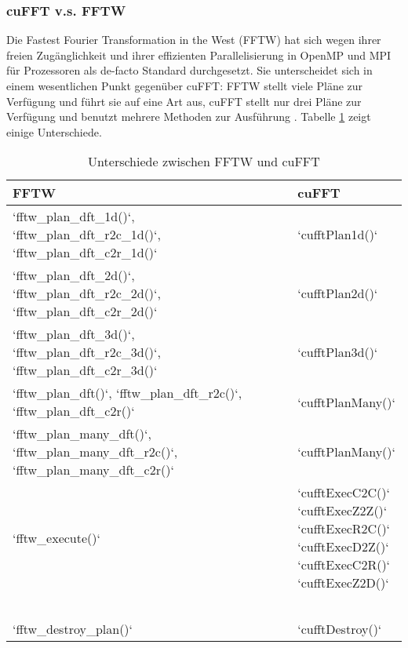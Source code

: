 		 	\subsubsection{cuFFT v.s. FFTW}\label{fftw}
		 	Die Fastest Fourier Transformation in the West (FFTW) hat sich wegen ihrer freien Zugänglichkeit und ihrer effizienten Parallelisierung in OpenMP und MPI für Prozessoren als de-facto Standard durchgesetzt. Sie unterscheidet sich in einem wesentlichen Punkt gegenüber cuFFT: FFTW stellt viele Pläne zur Verfügung und führt sie auf eine Art aus, cuFFT stellt nur drei Pläne zur Verfügung und benutzt mehrere Methoden zur Ausführung \autocite{FFTW05}. Tabelle \ref{tab5:fftw} zeigt einige Unterschiede.
		 	\begin{table}[h]
		 	\centering
		 	\begin{tabular}{|l|l|}
		 		\hline
		 		FFTW & cuFFT \\ \hline\hline
		 		\li`fftw_plan_dft_1d()`, \li`fftw_plan_dft_r2c_1d()`, \li`fftw_plan_dft_c2r_1d()` & \li`cufftPlan1d()` \\ \hline
		 		\li`fftw_plan_dft_2d()`, \li`fftw_plan_dft_r2c_2d()`, \li`fftw_plan_dft_c2r_2d()` & \li`cufftPlan2d()` \\ \hline
		 		\li`fftw_plan_dft_3d()`, \li`fftw_plan_dft_r2c_3d()`, \li`fftw_plan_dft_c2r_3d()` & \li`cufftPlan3d()` \\ \hline
		 		\li`fftw_plan_dft()`, \li`fftw_plan_dft_r2c()`, \li`fftw_plan_dft_c2r()` & \li`cufftPlanMany()` \\ \hline
		 		\li`fftw_plan_many_dft()`, \li`fftw_plan_many_dft_r2c()`, \li`fftw_plan_many_dft_c2r()` & \li`cufftPlanMany()` \\ \hline
		 		\li`fftw_execute()` & \multirowcell{6}{\li`cufftExecC2C()`\\ \li`cufftExecZ2Z()`\\ \li`cufftExecR2C()`\\ \li`cufftExecD2Z()`\\ \li`cufftExecC2R()`\\ \li`cufftExecZ2D()`} \\
		 		& \\
		 		& \\
		 		& \\
		 		& \\
		 		& \\ \hline
		 		\li`fftw_destroy_plan()` & \li`cufftDestroy()` \\ \hline\bottomrule
		 	\end{tabular}
		 	\caption[cuFFT v.s. FFTW]{Unterschiede zwischen FFTW und cuFFT}
		 	\label{tab5:fftw}
		 	\end{table}
		 	
